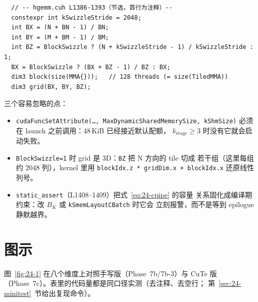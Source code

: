 \begin{lstlisting}
  // -- hgemm.cuh L1386-1393（节选，首行为注释）--
  constexpr int kSwizzleStride = 2048;
  int BX = (N + BN - 1) / BN;
  int BY = (M + BM - 1) / BM;
  int BZ = BlockSwizzle ? (N + kSwizzleStride - 1) / kSwizzleStride : 1;
  BX = BlockSwizzle ? (BX + BZ - 1) / BZ : BX;
  dim3 block(size(MMA{}));   // 128 threads (= size(TiledMMA))
  dim3 grid(BX, BY, BZ);
\end{lstlisting}



三个容易忽略的点：

\begin{itemize}
  \item \texttt{cuda\allowbreak{}Func\allowbreak{}Set\allowbreak{}Attribute\allowbreak{}(\dots,\allowbreak{} Max\allowbreak{}Dynamic\allowbreak{}Shared\allowbreak{}Memory\allowbreak{}Size,\allowbreak{} k\allowbreak{}Shm\allowbreak{}Size)}
        必须在 launch 之前调用：48\,KiB 已经接近默认配额，
        $k_{\mathrm{stage}}\geq3$ 时没有它就会启动失败。
  \item \texttt{Block\allowbreak{}Swizzle=\allowbreak{}1} 时 grid 是 3D：\texttt{BZ} 把 N 方向的 tile 切成
        若干组（这里每组约 2048 列），kernel 里用
        \texttt{blockIdx.z * gridDim.x + blockIdx.x} 还原线性列号。
  \item \texttt{static\_\allowbreak{}assert}（L1408--1409）把式~\eqref{eq:24-cpipe} 的容量
        关系固化成编译期约束：改 $B_K$ 或 \texttt{k\allowbreak{}Smem\allowbreak{}Layout\allowbreak{}CBatch} 时它会
        立刻报警，而不是等到 epilogue 静默越界。
\end{itemize}

\needspace{75mm}

\section{图示}

图~\ref{fig:24-1} 在八个维度上对照手写版（Phase~7b/7b-3）与 CuTe 版
（Phase~7c）。表里的代码量都是同口径实测（去注释、去空行；
第~\ref{sec:24-minitest}~节给出复现命令）。

